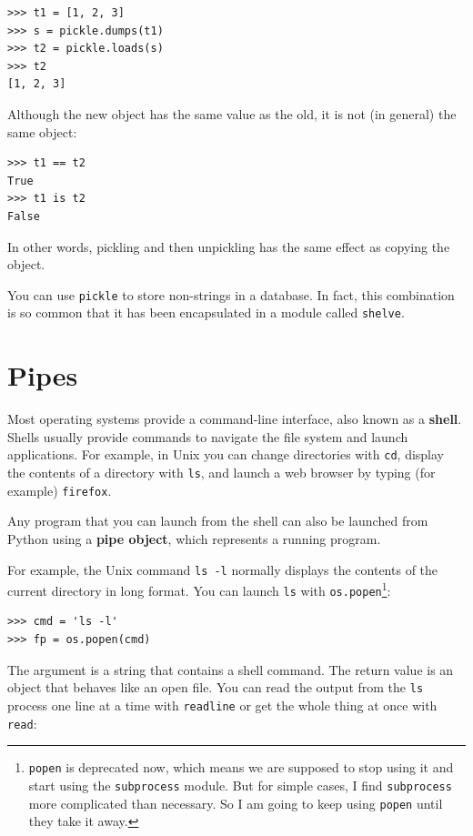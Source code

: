 \documentclass[10pt]{book}
\begin{document}
\begin{verbatim}
>>> t1 = [1, 2, 3]
>>> s = pickle.dumps(t1)
>>> t2 = pickle.loads(s)
>>> t2
[1, 2, 3]
\end{verbatim}
%
Although the new object has the same value as the old, it is
not (in general) the same object:

\begin{verbatim}
>>> t1 == t2
True
>>> t1 is t2
False
\end{verbatim}
%
In other words, pickling and then unpickling has the same effect
as copying the object.

You can use {\tt pickle} to store non-strings in a database.
In fact, this combination is so common that it has been
encapsulated in a module called {\tt shelve}.


\section{Pipes}

Most operating systems provide a command-line interface,
also known as a {\bf shell}.  Shells usually provide commands
to navigate the file system and launch applications.  For
example, in Unix you can change directories with {\tt cd},
display the contents of a directory with {\tt ls}, and launch
a web browser by typing (for example) {\tt firefox}.

Any program that you can launch from the shell can also be
launched from Python using a {\bf pipe object}, which
represents a running program.

For example, the Unix command {\tt ls -l} normally displays the
contents of the current directory in long format.  You can
launch {\tt ls} with {\tt os.popen}\footnote{{\tt popen} is deprecated
now, which means we are supposed to stop using it and start using
the {\tt subprocess} module.  But for simple cases, I find
{\tt subprocess} more complicated than necessary.  So I am going
to keep using {\tt popen} until they take it away.}:

\begin{verbatim}
>>> cmd = 'ls -l'
>>> fp = os.popen(cmd)
\end{verbatim}
%
The argument is a string that contains a shell command.  The
return value is an object that behaves like an open
file.  You can read the output from the {\tt ls} process one
line at a time with {\tt readline} or get the whole thing at
once with {\tt read}:
\end{document}
